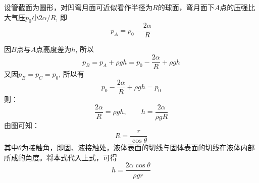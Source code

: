 设管截面为圆形，对凹弯月面可近似看作半径为$R$的球面，弯月面下$A$点的压强比大气压$p_0$小$2\alpha/R$, 即
\[p_A=p_0-\frac{2\alpha}{R}\]

因$B$点与$A$点高度差为$h$, 所以
\[p_B=p_A+\rho gh=p_0-\frac{2\alpha}{R}+\rho gh\]
又因$p_B=p_C=p_0$, 所以有
\[p_0-\frac{2\alpha}{R}+\rho gh=p_0\]
则：
\[\frac{2\alpha}{R}=\rho gh,\qquad h=\frac{2\alpha}{\rho gR}\]
由图可知：
\[R=\frac{r}{\cos\theta}\]
其中$\theta$为接触角，即固、液接触处，液体表面的切线与固体表面的切线在液体内部所成的角度。将本式代入上式，可得
\[h=\frac{2\alpha\cos\theta}{\rho gr}\]




